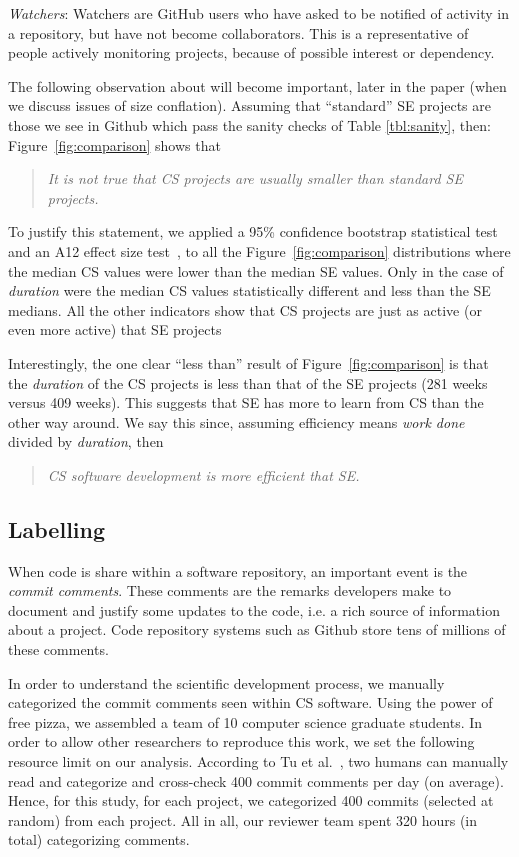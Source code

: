 \documentclass[sigconf,review,anonymous]{acmart}
\begin{document}
   \textit{Watchers}: Watchers are GitHub users who have asked to be notified of activity in a repository, but have not become collaborators. This is a representative of people actively monitoring projects, because of possible interest or dependency.
   
  
  The following observation about 
  will become important, later in the paper (when we discuss issues of size conflation).
Assuming that ``standard'' SE projects are those we see in Github which pass the sanity checks of Table \ref{tbl:sanity}, then:
 Figure~\ref{fig:comparison} shows that
  \begin{quote}
  {\em It is not true that CS projects are usually smaller than standard SE projects.}
  \end{quote}
 To justify this statement, we applied 
  a 95\% confidence bootstrap statistical test~\cite{efron94} and an A12 effect size test~\cite{arcuri2011practical}, to all the  Figure~\ref{fig:comparison} distributions where the median CS values were lower than the median SE values.
Only in the case of {\em duration} were the median CS values statistically different and less than the SE medians. All the other indicators show that CS projects are just as active (or even more active) that SE projects 

Interestingly, the one clear ``less than'' result of Figure~\ref{fig:comparison} is that the {\em duration} of the CS projects is less than that of the SE projects (281 weeks versus 409 weeks). This suggests that SE has more to learn from CS than the other way around.
We say this since, assuming efficiency means {\em work done} divided by {\em duration}, then
\begin{quote}
{\em CS software development is  more efficient that SE.}
\end{quote} 

     



 \subsection{Labelling}
 When code is share
within a software repository, an important event is the {\em commit comments}. These comments are the remarks developers make to document and justify some updates to the code, i.e. a rich source of information about a project. Code repository systems such as Github store tens of millions of these comments. 

In order to understand the scientific development process, we manually categorized the commit comments seen within CS
software. 
Using the power of free pizza, we assembled a team of 10 computer science 
graduate students.
In order to allow other researchers to reproduce this work, we set
the following
resource limit on our analysis.
According to Tu et al.~\cite{tu2019better}, two humans can manually read and categorize
and cross-check 400 commit comments per day (on average).
Hence, for this study, for each project, we categorized 400 commits
(selected at random) from each project. 
All in all, our
reviewer team spent 320 hours (in total) categorizing comments.
\end{document}

